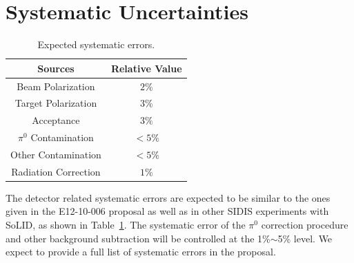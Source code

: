 \section{Systematic Uncertainties}
\begin{table}[!htp]
\centering
\begin{tabular}{|c|c|}
\hline
{\bf Sources}                  & {\bf Relative Value} \\\hline
Beam Polarization              & $2\%$ \\\hline 
Target Polarization            & $3\%$ \\\hline 
Acceptance                     & $3\%$ \\\hline
$\pi^{0}$ Contamination        & $<5\%$  \\\hline
Other Contamination            & $<5\%$ \\\hline
Radiation Correction           & $1\%$ \\\hline
\end{tabular}
\caption{\footnotesize{Expected systematic errors.}}\label{table:det_sys_err}
\end{table}
The detector related systematic errors are expected to be similar to the ones given in the E12-10-006 proposal as well as in other SIDIS experiments with SoLID, as shown in Table~\ref{table:det_sys_err}. The systematic error of the $\pi^{0}$ correction procedure and other background subtraction will be controlled at the 1\%$\sim$5\% level. %
We expect to provide a full list of systematic errors in the proposal. 
